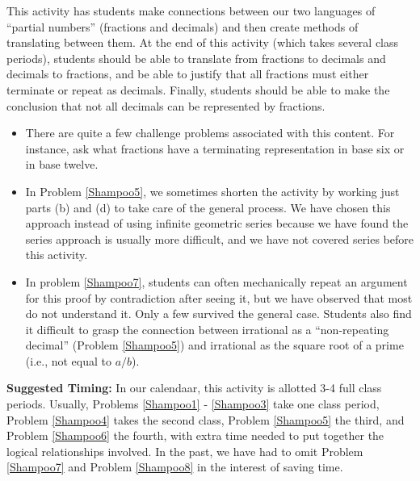\documentclass[nooutcomes]{ximera}
\begin{document}
\newpage
\begin{instructorNotes}
This activity has students make connections between our two languages of ``partial numbers'' (fractions and decimals) and then create methods of translating between them.  At the end of this activity (which takes several class periods), students should be able to translate from fractions to decimals and 
decimals to fractions, and be able to justify that all fractions must either terminate or repeat as decimals.  Finally, students should be able to make the conclusion that not all decimals can be represented by fractions.

\begin{itemize}
\item There are quite a few challenge problems associated with this content.  For instance, ask what fractions have a terminating representation in base six or in base twelve.
\item In Problem \ref{Shampoo5}, we sometimes shorten the activity by working just parts (b) and (d) to take care of the general process.   We have chosen this approach instead of using infinite geometric series because we have found the series approach is usually more difficult, and we have not covered series before this activity. %
\item In problem \ref{Shampoo7}, students can often mechanically repeat an argument for this proof by contradiction after seeing it, but we have observed that most do not understand it.  Only a few survived the general case.  Students also find it difficult to grasp the connection between irrational as a ``non-repeating decimal'' (Problem \ref{Shampoo5}) and irrational as the square root of a prime (i.e., not equal to $a/b$).

\end{itemize}


{\bf Suggested Timing:} In our calendaar, this activity is allotted 3-4 full class periods.  Usually, Problems \ref{Shampoo1} - \ref{Shampoo3} take one class period, Problem \ref{Shampoo4} takes the second class, Problem \ref{Shampoo5} the third, and Problem \ref{Shampoo6} the fourth, with extra time needed to put together the logical relationships involved.  In the past, we have had to omit Problem \ref{Shampoo7} and Problem \ref{Shampoo8} in the interest of saving time.  
\end{instructorNotes}
\end{document}
